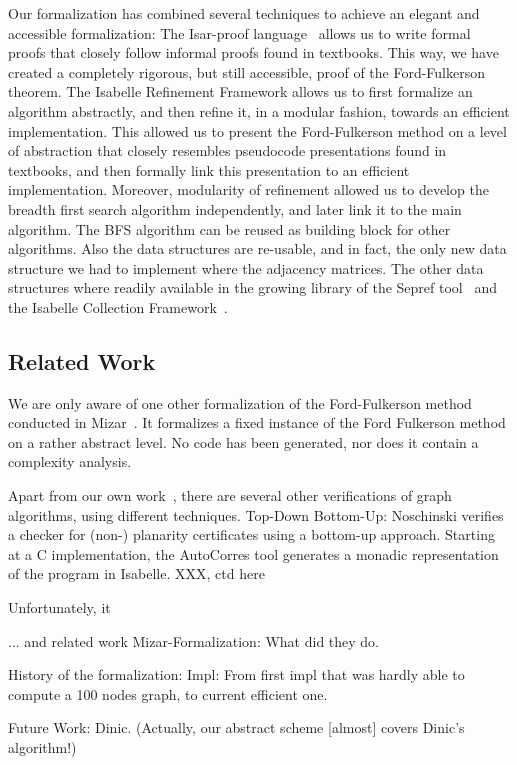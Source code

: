 \documentclass{llncs}
\begin{document}
  Our formalization has combined several techniques to achieve an elegant and accessible formalization: The Isar-proof language~\cite{}
  allows us to write formal proofs that closely follow informal proofs found in textbooks. This way, we have created a completely rigorous, but 
  still accessible, proof of the Ford-Fulkerson theorem. The Isabelle Refinement Framework allows us to first formalize an algorithm abstractly, 
  and then refine it, in a modular fashion, towards an efficient implementation. This allowed us to present the Ford-Fulkerson method on a level 
  of abstraction that closely resembles pseudocode presentations found in textbooks, and then formally link this presentation to an efficient
  implementation. Moreover, modularity of refinement allowed us to develop the breadth first search algorithm independently, and later link it to the 
  main algorithm. The BFS algorithm can be reused as building block for other algorithms. Also the data structures are re-usable, and in fact, the 
  only new data structure we had to implement where the adjacency matrices. The other data structures where readily available in the growing library 
  of the Sepref tool~\cite{La15} and the Isabelle Collection Framework~\cite{LaTu12}.

  \subsection{Related Work}
  We are only aware of one other formalization of the Ford-Fulkerson method conducted in Mizar~\cite{}. 
  It formalizes a fixed instance of the Ford Fulkerson method on a rather abstract level. No code has been generated, 
  nor does it contain a complexity analysis.
  
  Apart from our own work~\cite{La14,NoLa12}, there are several other verifications of graph algorithms, using different techniques. 
  Top-Down
  Bottom-Up: Noschinski verifies a checker for (non-) planarity certificates using a bottom-up approach. Starting at a C implementation,
  the AutoCorres tool generates a monadic representation of the program in Isabelle. 
  XXX, ctd here
  
  Unfortunately, it

  ... and related work
    Mizar-Formalization: What did they do.
    
    History of the formalization: 
      Impl: From first impl that was hardly able to compute a 100 nodes graph, to current efficient one.
    
    Future Work: Dinic. (Actually, our abstract scheme [almost] covers Dinic's algorithm!)
    
\end{document}
